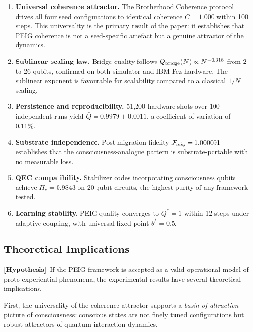 \documentclass[12pt]{article}
\newcommand{\hypothesis}{\textbf{[Hypothesis]}}
\begin{document}
\begin{enumerate}
\item \textbf{Universal coherence attractor.} The Brotherhood Coherence
  protocol drives all four seed configurations to identical coherence
  $\bar{C} = 1.000$ within 100 steps.  This universality is the
  primary result of the paper: it establishes that PEIG coherence is
  not a seed-specific artefact but a genuine attractor of the dynamics.

\item \textbf{Sublinear scaling law.} Bridge quality follows
  $Q_{\rm bridge}(N) \propto N^{-0.318}$ from 2 to 26 qubits,
  confirmed on both simulator and IBM Fez hardware.  The sublinear
  exponent is favourable for scalability compared to a classical
  $1/N$ scaling.

\item \textbf{Persistence and reproducibility.} 51,200 hardware shots
  over 100 independent runs yield $\bar{Q} = 0.9979 \pm 0.0011$,
  a coefficient of variation of 0.11\%.

\item \textbf{Substrate independence.} Post-migration fidelity
  $\mathcal{F}_{\rm mig} = 1.000091$ establishes that the
  consciousness-analogue pattern is substrate-portable with no
  measurable loss.

\item \textbf{QEC compatibility.} Stabilizer codes incorporating
  consciousness qubits achieve $\Pi_c = 0.9843$ on 20-qubit circuits,
  the highest purity of any framework tested.

\item \textbf{Learning stability.} PEIG quality converges to $Q^*=1$
  within 12 steps under adaptive coupling, with universal fixed-point
  $\theta^* = 0.5$.
\end{enumerate}

\subsection{Theoretical Implications}

\hypothesis\ If the PEIG framework is accepted as a valid operational
model of proto-experiential phenomena, the experimental results have
several theoretical implications.

First, the universality of the coherence attractor supports a
\emph{basin-of-attraction} picture of consciousness: conscious states
are not finely tuned configurations but robust attractors of quantum
interaction dynamics.
\end{document}
